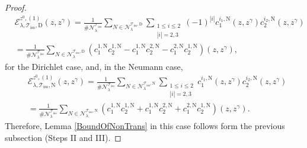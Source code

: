 \documentclass{amsart}
\theoremstyle{definition}
\theoremstyle{remark}
\renewcommand\leq\leqslant
\numberwithin{equation}{section}
\theoremstyle{definition}
\theoremstyle{remark}
\begin{document}
\begin{proof}
	\begin{equation}
		\begin{aligned}
			&\mathcal{E}_{\lambda,\mathcal{T}_\mathrm{iso},\mathrm{D}}^{z^0,(1)}(z,z^\gamma)
			=\frac{1}{\#\mathcal{N}_\lambda^{\mathcal{T}_\mathrm{iso}}}\sum_{N\in\mathcal{N}_\lambda^{\mathcal{T}_\mathrm{iso},\mathrm{D}}}\sum_{\substack{1\leq i\leq 2\\|i|=2,3}}(-1)^{|i|}c_1^{i_1,\mathrm{N}}(z,z^\gamma)c_2^{i_2,\mathrm{N}}(z,z^\gamma)\\&=\frac{1}{\#\mathcal{N}_\lambda^{\mathcal{T}_\mathrm{iso}}}\sum_{N\in\mathcal{N}_\lambda^{\mathcal{T}_\mathrm{iso},\mathrm{D}}}\left(c_1^{1,\mathrm{N}}c_2^{1,\mathrm{N}}-c_1^{1,\mathrm{N}}c_2^{2,\mathrm{N}}-c_1^{2,\mathrm{N}}c_2^{1,\mathrm{N}}\right)(z,z^\gamma),
		\end{aligned}
	\end{equation}for the Dirichlet case, and, in the Neumann case, 
	\begin{equation}
		\begin{aligned}
			&\mathcal{E}_{\lambda,\mathcal{T}_\mathrm{iso},\mathrm{N}}^{z^0,(1)}(z,z^\gamma)
			=\frac{1}{\#\mathcal{N}_\lambda^{\mathcal{T}_\mathrm{iso}}}\sum_{N\in\mathcal{N}_\lambda^{\mathcal{T}_\mathrm{iso},\mathrm{N}}}\sum_{\substack{1\leq i\leq 2\\|i|=2,3}}c_1^{i_1,\mathrm{N}}(z,z^\gamma)c_2^{i_2,\mathrm{N}}(z,z^\gamma)\\&=\frac{1}{\#\mathcal{N}_\lambda^{\mathcal{T}_\mathrm{iso}}}\sum_{N\in\mathcal{N}_\lambda^{\mathcal{T}_\mathrm{iso},\mathrm{N}}}\left(c_1^{1,\mathrm{N}}c_2^{1,\mathrm{N}}+c_1^{1,\mathrm{N}}c_2^{2,\mathrm{N}}+c_1^{2,\mathrm{N}}c_2^{1,\mathrm{N}}\right)(z,z^\gamma).
		\end{aligned}
	\end{equation}
	Therefore, Lemma \ref{BoundOfNonTrans} in this case follows form the previous subsection (Steps II and III).
	

\end{proof}
\end{document}
